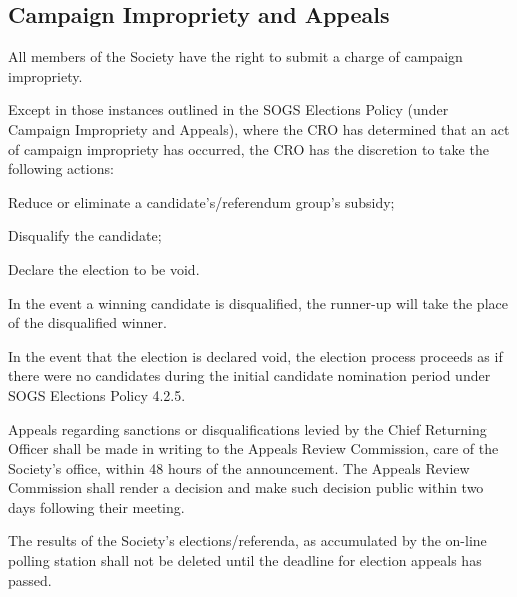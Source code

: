 \subsection{Campaign Impropriety and Appeals}

\begin{longenum}[ label*=\thesubsection.\arabic*., align=left]
	\item All members of the Society have the right to submit a charge of campaign impropriety.
    \item Except in those instances outlined in the SOGS Elections Policy (under Campaign Impropriety and Appeals), where the CRO has determined that an act of campaign impropriety  has occurred, the CRO has the discretion to take the following actions:
   
    \begin{longenum}[ label*=\arabic*., align=left]
		\item Reduce or eliminate a candidate's/referendum group's subsidy;
        \item Disqualify the candidate;
        \item Declare the election to be void.
	\end{longenum}
    \item In the event a winning candidate is disqualified, the runner-up will take the place of the disqualified winner.
    \begin{longenum}[ label*=\arabic*., align=left]
		\item In the event that the election is declared void, the election process proceeds as if there were no candidates during the initial candidate nomination period under SOGS Elections Policy 4.2.5. 
	\end{longenum}
    \item Appeals regarding sanctions or disqualifications levied by the Chief Returning Officer shall be made in writing to the Appeals Review Commission, care of the Society's office, within 48 hours of the announcement. The Appeals Review Commission shall render a decision and make such decision public within two days following their meeting.
    \item The results of the Society's elections/referenda, as accumulated by the on-line polling station shall not be deleted until the deadline for election appeals has passed.
\end{longenum}

